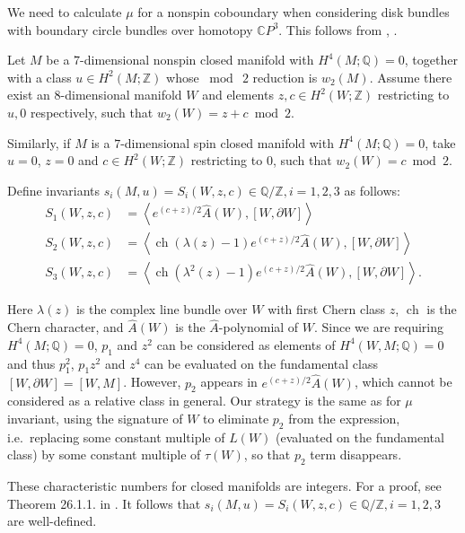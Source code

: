 \documentclass[twoside]{article}
\begin{document}
We need to calculate $\mu$ for a nonspin coboundary when considering disk bundles with boundary circle bundles over homotopy $\mathbb{C}P^3$. This follows from \cite{kreckstolz2}, \cite{kreckstolz}. 


Let $M$ be a $7$-dimensional nonspin closed manifold with 
$H^4(M; \mathbb{Q})  =  0$, 
together with a class $u  \in   H^2(M; \mathbb{Z})$ whose $\bmod  \ 2$ 
reduction is $w_2(M)$. Assume there exist an $8$-dimensional manifold
$W$ and elements $z,c \in H^2(W; \mathbb{Z})$ 
restricting to $u,0$ respectively, 
such that $w_2(W) = z + c \bmod 2$. 

Similarly, if $M$ is a $7$-dimensional spin closed manifold with 
$H^4(M; \mathbb{Q})  =  0$, 
take $u = 0$, $z = 0$ and $c  \in   H^2(W; \mathbb{Z})$ 
restricting to $0$, such that $w_2(W) = c \bmod 2$. 

Define invariants $s_i(M, u) = S_i(W,z,c) \in   \mathbb{Q}/\mathbb{Z}, i = 1,2,3$ as follows: 
\[
\begin{aligned}
S_{1}(W, z, c)& = \left\langle e^{(c + z) / 2} \widehat{A}(W),[W, \partial W]\right\rangle \\
S_{2}(W, z, c)& = \left\langle\operatorname{ch}(\lambda(z)-1) e^{(c + z) / 2} \widehat{A}(W),[W, \partial W]\right\rangle \\
S_{3}(W, z, c)& = \left\langle\operatorname{ch}(\lambda^{2}(z)-1) e^{(c + z) / 2} \widehat{A}(W),[W, \partial W]\right\rangle.
\end{aligned}
\]

Here $\lambda(z)$ is the complex line bundle over $W$ with first Chern class $z$, $\operatorname{ch}$ is the Chern character, and $\widehat{A}(W)$ is the $\widehat{A}$-polynomial of $W$. Since we are requiring $H^4(M; \mathbb{Q})  =  0$, $p_1$ and $z^2$ can be considered as elements of $H^4(W,M; \mathbb{Q})  =  0$ and thus $p_1^2$, $p_1z^2$ and $z^4$ can be evaluated on the fundamental class $[W, \partial W] = [W, M]$. However, $p_2$ appears in $e^{(c + z) / 2} \widehat{A}(W)$, which cannot be considered as a relative class in general. Our strategy is the same as for $\mu$ invariant, using the signature of $W$ to eliminate $p_2$ from the expression, i.e.\ replacing some constant multiple of $L(W)$ (evaluated on the fundamental class) by some constant multiple of $\tau(W)$, so that $p_2$ term disappears. 

These characteristic numbers for closed manifolds are integers. For a proof, see Theorem 26.1.1. in \cite{hirzebruchtopological}. It follows that $s_i(M, u) = S_i(W,z,c) \in   \mathbb{Q}/\mathbb{Z}, i = 1,2,3$ are well-defined. 
\end{document}

